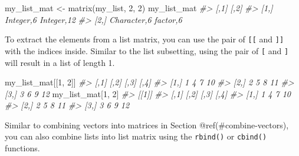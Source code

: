 \documentclass[
]{book}
\newenvironment{Shaded}{\begin{snugshade}}{\end{snugshade}}
\newcommand{\CommentTok}[1]{\textcolor[rgb]{0.56,0.35,0.01}{\textit{#1}}}
\newcommand{\DecValTok}[1]{\textcolor[rgb]{0.00,0.00,0.81}{#1}}
\newcommand{\FunctionTok}[1]{\textcolor[rgb]{0.00,0.00,0.00}{#1}}
\newcommand{\NormalTok}[1]{#1}
\newcommand{\OtherTok}[1]{\textcolor[rgb]{0.56,0.35,0.01}{#1}}
\begin{document}
\begin{Shaded}
\begin{Highlighting}[]
\NormalTok{my\_list\_mat }\OtherTok{\textless{}{-}} \FunctionTok{matrix}\NormalTok{(my\_list, }\DecValTok{2}\NormalTok{, }\DecValTok{2}\NormalTok{)}
\NormalTok{my\_list\_mat}
\CommentTok{\#\textgreater{}      [,1]        [,2]      }
\CommentTok{\#\textgreater{} [1,] Integer,6   Integer,12}
\CommentTok{\#\textgreater{} [2,] Character,6 factor,6}
\end{Highlighting}
\end{Shaded}

To extract the elements from a list matrix, you can use the pair of \texttt{{[}{[}} and \texttt{{]}{]}} with the indices inside. Similar to the list subsetting, using the pair of \texttt{{[}} and \texttt{{]}} will result in a list of length 1.

\begin{Shaded}
\begin{Highlighting}[]
\NormalTok{my\_list\_mat[[}\DecValTok{1}\NormalTok{, }\DecValTok{2}\NormalTok{]]}
\CommentTok{\#\textgreater{}      [,1] [,2] [,3] [,4]}
\CommentTok{\#\textgreater{} [1,]    1    4    7   10}
\CommentTok{\#\textgreater{} [2,]    2    5    8   11}
\CommentTok{\#\textgreater{} [3,]    3    6    9   12}
\NormalTok{my\_list\_mat[}\DecValTok{1}\NormalTok{, }\DecValTok{2}\NormalTok{]}
\CommentTok{\#\textgreater{} [[1]]}
\CommentTok{\#\textgreater{}      [,1] [,2] [,3] [,4]}
\CommentTok{\#\textgreater{} [1,]    1    4    7   10}
\CommentTok{\#\textgreater{} [2,]    2    5    8   11}
\CommentTok{\#\textgreater{} [3,]    3    6    9   12}
\end{Highlighting}
\end{Shaded}

Similar to combining vectors into matrices in Section @ref(\#combine-vectors), you can also combine lists into list matrix using the \texttt{rbind()} or \texttt{cbind()} functions.
\end{document}

